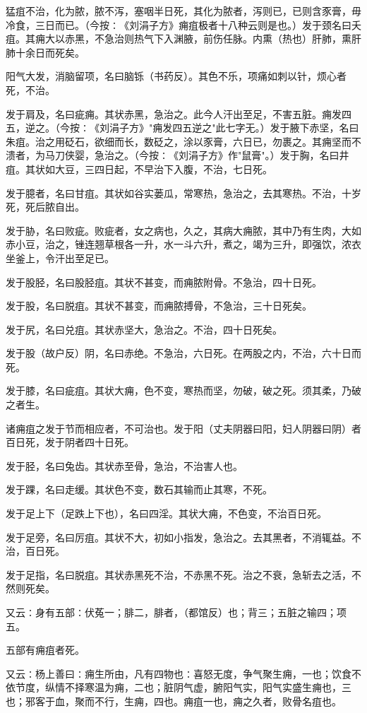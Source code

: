 \documentclass[a4paper,12pt,UTF8,twoside]{ctexbook}
\begin{document}
猛疽不治，化为脓，脓不泻，塞咽半日死，其化为脓者，泻则已，已则含豕膏，毋冷食，三日而已。（今按∶《刘涓子方》痈疽极者十八种云则是也。）发于颈名曰夭疽。其痈大以赤黑，不急治则热气下入渊腋，前伤任脉。内熏（热也）肝肺，熏肝肺十余日而死矣。

阳气大发，消脑留项，名曰脑铄（书药反）。其色不乐，项痛如刺以针，烦心者死，不治。

发于肩及，名曰疵痈。其状赤黑，急治之。此今人汗出至足，不害五脏。痈发四五，逆之。（今按∶《刘涓子方》"痈发四五逆之"此七字无。）发于腋下赤坚，名曰朱疽。治之用砭石，欲细而长，数砭之，涂以豕膏，六日已，勿裹之。其痈坚而不溃者，为马刀侠婴，急治之。（今按∶《刘涓子方》作"鼠膏"。）发于胸，名曰井疽。其状如大豆，三四日起，不早治下入腹，不治，七日死。

发于臆者，名曰甘疽。其状如谷实蒌瓜，常寒热，急治之，去其寒热。不治，十岁死，死后脓自出。

发于胁，名曰败疵。败疵者，女之病也，久之，其病大痈脓，其中乃有生肉，大如赤小豆，治之，锉连翘草根各一升，水一斗六升，煮之，竭为三升，即强饮，浓衣坐釜上，令汗出至足已。

发于股胫，名曰股胫疽。其状不甚变，而痈脓附骨。不急治，四十日死。

发于股，名曰脱疽。其状不甚变，而痈脓搏骨，不急治，三十日死矣。

发于尻，名曰兑疽。其状赤坚大，急治之。不治，四十日死矣。

发于股（故户反）阴，名曰赤绝。不急治，六日死。在两股之内，不治，六十日而死。

发于膝，名曰疵疽。其状大痈，色不变，寒热而坚，勿破，破之死。须其柔，乃破之者生。

诸痈疽之发于节而相应者，不可治也。发于阳（丈夫阴器曰阳，妇人阴器曰阴）者百日死，发于阴者四十日死。

发于胫，名曰兔齿。其状赤至骨，急治，不治害人也。

发于踝，名曰走缓。其状色不变，数石其输而止其寒，不死。

发于足上下（足跌上下也），名曰四淫。其状大痈，不色变，不治百日死。

发于足旁，名曰厉疽。其状不大，初如小指发，急治之。去其黑者，不消辄益。不治，百日死。

发于足指，名曰脱疽。其状赤黑死不治，不赤黑不死。治之不衰，急斩去之活，不然则死矣。

又云∶身有五部∶伏菟一；腓二，腓者，（都馆反）也；背三；五脏之输四；项五。

五部有痈疽者死。

又云∶杨上善曰∶痈生所由，凡有四物也∶喜怒无度，争气聚生痈，一也；饮食不依节度，纵情不择寒温为痈，二也；脏阴气虚，腑阳气实，阳气实盛生痈也，三也；邪客于血，聚而不行，生痈，四也。痈疽一也，痈之久者，败骨名疽也。
\end{document}
